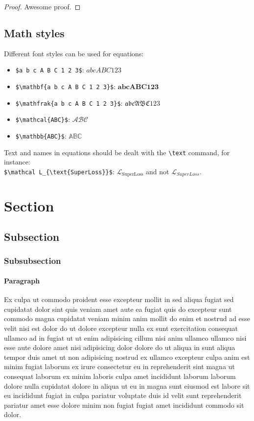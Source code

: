 \documentclass[accepted]{melba}
\begin{document}
		\begin{proof}
			Awesome proof.
		\end{proof}

	\subsection{Math styles}
		Different font styles can be used for equations:
		\begin{itemize}
			\item \verb|$a b c A B C 1 2 3$|: $ a b c A B C 1 2 3 $
			\item \verb|$\mathbf{a b c A B C 1 2 3}$|: $ \mathbf{a b c A B C 1 2 3} $
			\item \verb|$\mathfrak{a b c A B C 1 2 3}$|: $ \mathfrak{a b c A B C 1 2 3} $
			\item \verb|$\mathcal{ABC}$|: $ \mathcal{ABC} $
			\item \verb|$\mathbb{ABC}$|: $ \mathbb{ABC} $
		\end{itemize}

		Text and names in equations should be dealt with the \verb|\text| command, for instance:\\
		\verb|$\mathcal L_{\text{SuperLoss}}$|: $\mathcal L_{\text{SuperLoss}}$ and not $\mathcal L_{SuperLoss}$.



\section{Section}
	\subsection{Subsection}
		\subsubsection{Subsubsection}
			\paragraph{Paragraph} Ex culpa ut commodo proident esse excepteur mollit in sed aliqua fugiat sed cupidatat dolor sint quis veniam amet aute ea fugiat quis do excepteur sunt commodo magna cupidatat veniam minim anim mollit do enim et nostrud ad esse velit nisi est dolor do ut dolore excepteur nulla ex sunt exercitation consequat ullamco ad in fugiat ut ut enim adipisicing cillum nisi anim ullamco ullamco nisi esse aute dolore amet nisi adipisicing dolor dolore do ut aliqua in sunt aliqua tempor duis amet ut non adipisicing nostrud ex ullamco excepteur culpa anim est minim fugiat laborum ex irure consectetur eu in reprehenderit sint magna ut consequat laborum ex minim laboris culpa amet incididunt laborum laborum dolore nulla cupidatat dolore in aliqua ut eu in magna sunt eiusmod est labore sit eu incididunt fugiat in culpa pariatur voluptate duis id velit sunt reprehenderit pariatur amet esse dolore minim non fugiat fugiat amet incididunt commodo sit dolor.
\end{document}
